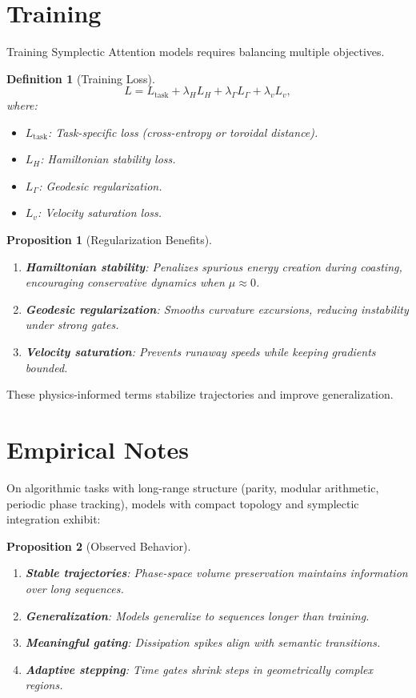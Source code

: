 \documentclass[12pt,letterpaper,twoside]{article}
\newtheorem{definition}{Definition}[section]
\newtheorem{prop}{Proposition}[section]
\begin{document}
\section{Training}

Training Symplectic Attention models requires balancing multiple objectives.

\begin{definition}[Training Loss]
\[
L = L_{\text{task}} + \lambda_H L_H + \lambda_\Gamma L_\Gamma + \lambda_v L_v,
\]
where:
\begin{itemize}
\item $L_{\text{task}}$: Task-specific loss (cross-entropy or toroidal distance).
\item $L_H$: Hamiltonian stability loss.
\item $L_\Gamma$: Geodesic regularization.
\item $L_v$: Velocity saturation loss.
\end{itemize}
\end{definition}

\begin{prop}[Regularization Benefits]
\begin{enumerate}
\item \textbf{Hamiltonian stability}: Penalizes spurious energy creation during coasting, encouraging conservative dynamics when $\mu \approx 0$.
\item \textbf{Geodesic regularization}: Smooths curvature excursions, reducing instability under strong gates.
\item \textbf{Velocity saturation}: Prevents runaway speeds while keeping gradients bounded.
\end{enumerate}
\end{prop}

These physics-informed terms stabilize trajectories and improve generalization.

\section{Empirical Notes}

On algorithmic tasks with long-range structure (parity, modular arithmetic, periodic phase tracking), models with compact topology and symplectic integration exhibit:

\begin{prop}[Observed Behavior]
\begin{enumerate}
\item \textbf{Stable trajectories}: Phase-space volume preservation maintains information over long sequences.
\item \textbf{Generalization}: Models generalize to sequences longer than training.
\item \textbf{Meaningful gating}: Dissipation spikes align with semantic transitions.
\item \textbf{Adaptive stepping}: Time gates shrink steps in geometrically complex regions.
\end{enumerate}
\end{prop}
\end{document}
